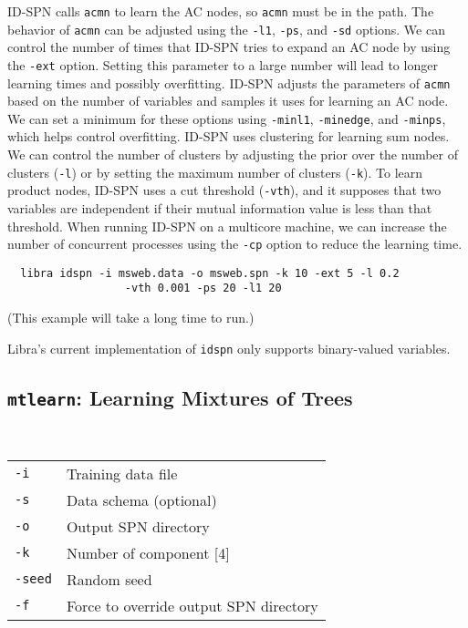 \documentclass[11pt]{article}
\begin{document}
ID-SPN calls {\tt acmn} to learn the AC nodes, so {\tt acmn} must be
in the path.  The behavior of {\tt acmn} can be adjusted using the
{\tt -l1}, {\tt -ps}, and {\tt -sd} options.  We can control the
number of times that ID-SPN tries to expand an AC node by using the
{\tt -ext} option. Setting this parameter to a large number will lead
to longer learning times and possibly overfitting.  ID-SPN adjusts the
parameters of {\tt acmn} based on the number of variables and samples
it uses for learning an AC node.  We can set a minimum for these
options using {\tt -minl1}, {\tt -minedge}, and {\tt -minps}, which
helps control overfitting.  ID-SPN uses clustering for learning sum
nodes.  We can control the number of clusters by adjusting the prior
over the number of clusters ({\tt -l}) or by setting the maximum
number of clusters ({\tt -k}).  To learn product nodes, ID-SPN uses a
cut threshold ({\tt -vth}), and it supposes that two variables are
independent if their mutual information value is less than that
threshold. When running ID-SPN on a multicore machine, we can increase
the number of concurrent processes using the {\tt -cp} option to
reduce the learning time.
\begin{verbatim}
  libra idspn -i msweb.data -o msweb.spn -k 10 -ext 5 -l 0.2
        		  -vth 0.001 -ps 20 -l1 20
\end{verbatim}
(This example will take a long time to run.)

Libra's current implementation of {\tt idspn} only supports binary-valued variables.

\subsection{{\tt mtlearn}: Learning Mixtures of Trees} \label{sec:mtlearn}

\noindent {} \\
\begin{tabular}{ll}
{\tt -i} &      Training data file \\
{\tt -s} &      Data schema (optional) \\
{\tt -o} &      Output SPN directory \\
{\tt -k} &      Number of component [4] \\
{\tt -seed} &   Random seed \\
{\tt -f} &      Force to override output SPN directory \\
\end{tabular} \\
\end{document}
